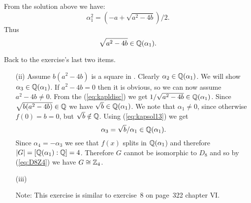 \begin{myenumerate}
From the solution above we have:
\begin{equation*}
  \alpha_1^2 = \left(-a + \sqrt{a^2 - 4b}\right)/2.
\end{equation*}
Thus
\begin{equation} \label{eq:kapldisc}
\sqrt{a^2 - 4b} \in \mathbb{Q}(\alpha_1).
\end{equation}

Back to the exercise's last two items.

\begin{itemize}
 \item[(ii)]
  Assume \(b(a^2-4b)\) is a square in \Q.
  Clearly \(\alpha_2\in\mathbb{Q}(\alpha_1)\).
  We will show \(\alpha_3\in\mathbb{Q}(\alpha_1)\).
  If \(a^2-4b = 0\) then it is obvious, so we can now assume \(a^2-4b \neq 0\).
  From the (\ref{eq:kapldisc}) we get \(1/\sqrt{a^2 - 4b} \in \mathbb{Q}(\alpha_1)\).
  Since  \(\sqrt{b(a^2-4b)} \in \mathbb{Q}\) we have \(\sqrt{b} \in \mathbb{Q}(\alpha_1)\).
  We note that \(\alpha_1 \neq 0\), since otherwise \(f(0) = b = 0\),
  but \(\sqrt{b}\notin \mathbb{Q}\).
  Using (\ref{eq:kapsol13}) we get
  \begin{equation*}
  \alpha_3 = \sqrt{b}/\alpha_1 \in \mathbb{Q}(\alpha_1).
  \end{equation*}
  Since \(\alpha_4 = -\alpha_3\) we see that \(f(x)\)
  splits in \(\mathbb{Q}(\alpha_1\)) and therefore \(|G| = [\mathbb{Q}(\alpha_1):\mathbb{Q}] = 4\).
  Therefore $G$ cannot be isomorphic to \(D_8\) and
  so by (\ref{eq:D8Z4}) we have \(G \cong \mathbb{Z}_4\).

 \item[(iii)]

  Note: This exercise is similar to exercise~8 on page~322
  \cite{Lang94} chapter \textsf{VI}.


\end{itemize}
\end{myenumerate}
